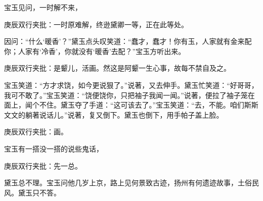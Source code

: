 \begin{parag}
    宝玉见问，一时解不来，\begin{note}庚辰双行夹批：一时原难解，终逊黛卿一等，正在此等处。\end{note}因问：“什么‘暖香’？”黛玉点头叹笑道：“蠢才，蠢才！你有玉，人家就有金来配你；人家有‘冷香’，你就没有‘暖香’去配？”宝玉方听出来。\begin{note}庚辰双行夹批：是颦儿，活画。然这是阿颦一生心事，故每不禁自及之。\end{note}宝玉笑道：“方才求饶，如今更说狠了。”说著，又去伸手。黛玉忙笑道：“好哥哥，我可不敢了。”宝玉笑道：“饶便饶你，只把袖子我闻一闻。”说著，便拉了袖子笼在面上，闻个不住。黛玉夺了手道：“这可该去了。”宝玉笑道：“去，不能。咱们斯斯文文的躺著说话儿。”说著，复又倒下。黛玉也倒下，用手帕子盖上脸。\begin{note}庚辰双行夹批：画。\end{note}宝玉有一搭没一搭的说些鬼话，\begin{note}庚辰双行夹批：先一总。\end{note}黛玉总不理。宝玉问他几岁上京，路上见何景致古迹，扬州有何遗迹故事，土俗民风。黛玉只不答。
\end{parag}


